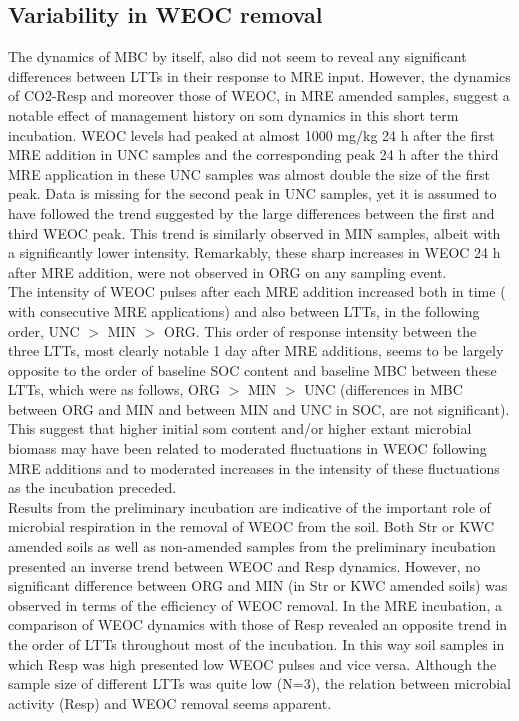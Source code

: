 	\subsection{Variability in WEOC removal}
	The dynamics of MBC by itself, also did not seem to reveal any significant differences between LTTs in their response to MRE input.
	However, the dynamics of CO2-Resp and moreover those of WEOC, in MRE amended samples, suggest a notable effect of management history on \gls{som} dynamics in this short term incubation. WEOC levels had peaked at almost 1000 mg/kg  24 h after the first MRE addition in UNC samples and the corresponding peak 24 h after the third MRE application in these UNC samples was almost double the size of the first peak. Data is missing for the second peak in UNC samples, yet it is assumed to have followed the trend suggested by the large differences between the first and third WEOC peak. This trend is similarly observed in MIN samples, albeit with a significantly lower intensity. Remarkably, these sharp increases in WEOC 24 h after MRE addition, were not observed in ORG on any sampling event.\\
	The intensity of WEOC pulses after each MRE addition increased both in time ( with consecutive MRE applications) and also between LTTs, in the following order, UNC $ > $ MIN $ > $ ORG. This order of response intensity between the three LTTs, most clearly notable 1 day after MRE additions, seems to be largely opposite to the order of baseline SOC content and baseline MBC between these LTTs, which were as follows, ORG $ > $ MIN $ > $ UNC (differences in MBC between ORG and MIN and between MIN and UNC in SOC, are not significant). This suggest  that higher initial \gls{som} content and/or higher extant microbial biomass may have been related to moderated fluctuations in WEOC following MRE additions and to moderated increases in the intensity of these fluctuations as the incubation preceded. \\
	Results from the preliminary incubation are indicative of the important role of microbial respiration in the removal of WEOC from the soil. Both Str or KWC amended soils as well as non-amended samples from the preliminary incubation presented an inverse trend between WEOC and Resp dynamics. However, no significant difference between ORG and MIN (in Str or KWC amended soils) was observed in terms of the efficiency of WEOC removal. In the MRE incubation, a comparison of WEOC dynamics with those of Resp revealed an opposite trend in the order of LTTs throughout most of the incubation. In this way soil samples in which Resp was high presented low WEOC pulses and vice versa. Although the sample size of different LTTs was quite low (N=3), the relation between microbial activity (Resp) and WEOC removal seems apparent. \\

